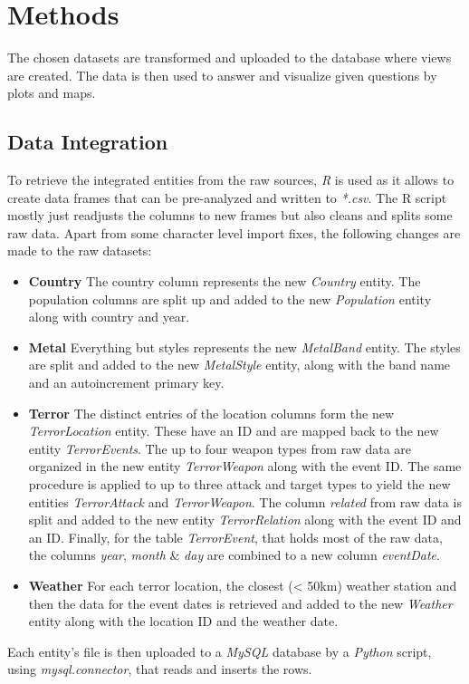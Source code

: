 \section{Methods}
The chosen datasets are transformed and uploaded to the database where views are created. The data is then used to answer and visualize given questions by plots and maps.


\subsection{Data Integration}
To retrieve the integrated entities from the raw sources, \emph{R} is used as it allows to create data frames that can be pre-analyzed and written to \emph{*.csv}. The R script mostly just readjusts the columns to new frames but also cleans and splits some raw data. Apart from some character level import fixes, the following changes are made to the raw datasets:
\begin{itemize}
\item \textbf{Country}
The country column represents the new \emph{Country} entity. The population columns are split up and added to the new \emph{Population} entity along with country and year. 
\item \textbf{Metal}
Everything but styles represents the new \emph{MetalBand} entity. The styles are split and added to the new \emph{MetalStyle} entity, along with the band name and an autoincrement primary key.
\item \textbf{Terror}
The distinct entries of the location columns form the new \emph{TerrorLocation} entity. These have an ID and are mapped back to the new entity \emph{TerrorEvents}. The up to four weapon types from raw data are organized in the new entity \emph{TerrorWeapon} along with the event ID. The same procedure is applied to up to three attack and target types to yield the new entities \emph{TerrorAttack} and \emph{TerrorWeapon}. The column \emph{related} from raw data is split and added to the new entity \emph{TerrorRelation} along with the event ID and an ID. Finally, for the table \emph{TerrorEvent}, that holds most of the raw data, the columns \emph{year}, \emph{month} \& \emph{day} are combined to a new column \emph{eventDate}.
\item \textbf{Weather}
For each terror location, the closest (< 50km) weather station and then the data for the event dates is retrieved and added to the new \emph{Weather} entity along with the location ID and the weather date.
\end{itemize}
Each entity's file is then uploaded to a \emph{MySQL} database by a \emph{Python} script, using \emph{mysql.connector}, that reads and inserts the rows.

